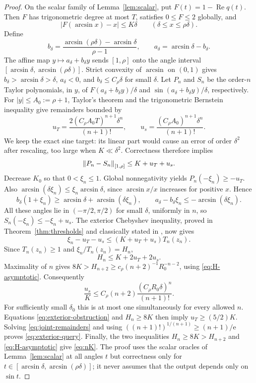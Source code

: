 \begin{proof}
On the scalar family of Lemma~\ref{lem:scalar}, put $F(t)=1-\operatorname{Re}q(t)$. Then $F$ has trigonometric degree at most $T$, satisfies $0\leq F\leq2$ globally, and
\[
 |F(\arcsin x)-x|\leq K\delta\qquad(\delta\leq x\leq\rho\delta).
\]
Define
\[
 b_\delta=\frac{\arcsin(\rho\delta)-\arcsin\delta}{\rho-1},
 \qquad a_\delta=\arcsin\delta-b_\delta.
\]
The affine map $y\mapsto a_\delta+b_\delta y$ sends $[1,\rho]$ onto the angle interval $[\arcsin\delta,\arcsin(\rho\delta)]$. Strict convexity of $\arcsin$ on $(0,1)$ gives $b_\delta>\arcsin\delta>\delta$, $a_\delta<0$, and $b_\delta\leq C_\rho\delta$ for small $\delta$.
Let $P_n$ and $S_n$ be the order-$n$ Taylor polynomials, in $y$, of $F(a_\delta+b_\delta y)/\delta$ and $\sin(a_\delta+b_\delta y)/\delta$, respectively. For $|y|\leq A_0:=\rho+1$, Taylor's theorem and the trigonometric Bernstein inequality give remainders bounded by
\begin{equation}\label{eq:joint-remainders}
 u_T=\frac{2(C_\rho A_0T)^{n+1}\delta^n}{(n+1)!},
 \qquad u_s=\frac{(C_\rho A_0)^{n+1}\delta^n}{(n+1)!}.
\end{equation}
We keep the exact sine target: its linear part would cause an error of order $\delta^2$ after rescaling, too large when $K\ll\delta^2$. Correctness therefore implies
\[
 \left\lVert P_n-S_n\right\rVert_{[1,\rho]}\leq K+u_T+u_s.
\]
Decrease $K_0$ so that $0<\xi_n\leq1$. Global nonnegativity yields $P_n(-\xi_n)\geq-u_T$. Also
$\arcsin(\delta \xi_n)\leq \xi_n\arcsin\delta$, since $\arcsin x/x$ increases for positive $x$. Hence
\[
 b_\delta(1+\xi_n)\geq\arcsin\delta+\arcsin(\delta \xi_n),
 \qquad a_\delta-b_\delta \xi_n\leq-\arcsin(\delta \xi_n).
\]
All these angles lie in $(-\pi/2,\pi/2)$ for small $\delta$, uniformly in $n$, so $S_n(-\xi_n)\leq-\xi_n+u_s$.
The exterior Chebyshev inequality, proved in Theorem~\ref{thm:thresholds} and classically stated in \cite[Proposition 2.1]{bos2020}, now gives
\[
 \xi_n-u_T-u_s\leq (K+u_T+u_s)T_n(z_n).
\]
Since $T_n(z_n)\geq1$ and $\xi_n/T_n(z_n)=H_n$,
\begin{equation}\label{eq:exterior-obstruction}
 H_n\leq K+2u_T+2u_s.
\end{equation}
Maximality of $n$ gives $8K>H_{n+2}\geq c_\rho(n+2)^{-1}R_0^{-n-2}$, using \eqref{eq:H-asymptotic}. Consequently
\[
 \frac{u_s}{K}\leq
 C_\rho(n+2)\frac{(C_\rho R_0\delta)^n}{(n+1)!}.
\]
For sufficiently small $\delta_0$ this is at most one simultaneously for every allowed $n$. Equations \eqref{eq:exterior-obstruction} and $H_n\geq8K$ then imply $u_T\geq(5/2)K$. Solving \eqref{eq:joint-remainders} and using $((n+1)!)^{1/(n+1)}\geq(n+1)/\mathrm e$ proves \eqref{eq:exterior-query}. Finally, the two inequalities $H_n\geq8K>H_{n+2}$ and \eqref{eq:H-asymptotic} give \eqref{eq:nK}. The proof uses the scalar oracles of Lemma~\ref{lem:scalar} at all angles $t$ but correctness only for $t\in[\arcsin\delta,\arcsin(\rho\delta)]$; it never assumes that the output depends only on $\sin t$.
\end{proof}

